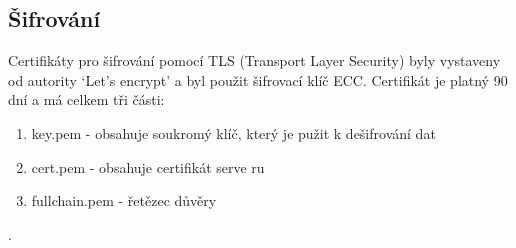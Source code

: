 \subsection{Šifrování}
Certifikáty  pro šifrování pomocí TLS (Transport Layer Security) byly vystaveny od autority `Let's encrypt' a byl použit šifrovací klíč ECC. Certifikát je platný 90 dní a má celkem tři části:
\begin{enumerate}
    \item key.pem - obsahuje soukromý klíč, který je pužit k dešifrování dat
    \item cert.pem - obsahuje certifikát serve  ru
    \item fullchain.pem - řetězec důvěry
\end{enumerate}.